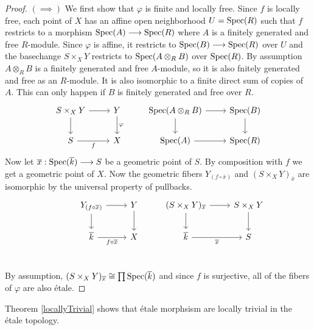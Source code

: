 \begin{proof}
  $(\implies)$
  We first show that $\varphi$ is finite and locally free. Since $f$ is locally free, each point of $X$ has an affine open neighborhood $U = \operatorname{Spec}(R)$ such that $f$ restricts to a morphism $\operatorname{Spec}(A) \longrightarrow \operatorname{Spec}(R)$ where $A$ is a finitely generated and free $R$-module. Since $\varphi$ is affine, it restricts to $\operatorname{Spec}(B) \longrightarrow \operatorname{Spec}(R)$ over $U$ and the basechange $S \times_X Y$ restricts to $\operatorname{Spec}(A \otimes_R B)$ over $\operatorname{Spec}(R)$. By assumption $A \otimes_R B$ is a finitely generated and free $A$-module, so it is also fnitely generated and free as an $R$-module. It is also isomorphic to a finite direct sum of copies of $A$. This can only happen if $B$ is finitely generated and free over $R$.
    \[
    \begin{tikzcd}
    	{S \times_X Y} & Y & {\Spec(A \otimes_RB)} & {\Spec(B)} \\
    	S & X & {\Spec(A)} & {\Spec(R)}
    	\arrow["\varphi", from=1-2, to=2-2]
    	\arrow["f"', from=2-1, to=2-2]
    	\arrow[from=1-1, to=1-2]
    	\arrow[from=1-1, to=2-1]
    	\arrow[from=1-3, to=2-3]
    	\arrow[from=2-3, to=2-4]
    	\arrow[from=1-3, to=1-4]
    	\arrow[from=1-4, to=2-4]
    \end{tikzcd}
    \]
  Now let $\overline{x} : \operatorname{Spec}(\overline{k}) \longrightarrow S$ be a geometric point of $S$. By composition with $f$ we get a geometric point of $X$. Now the geometric fibers $Y_{(f \circ \overline{x})}$ and $(S \times_X Y)_{\overline{x}}$  are isomorphic by the universal property of pullbacks. 
  \[
\begin{tikzcd}
	& {Y_{(f \circ \overline{x})}} & Y & {(S \times_X Y)_{\overline{x}}} & {S \times_X Y} \\
	& {\overline{k}} & X & {\overline{k}} & S \\
	{}
	\arrow[from=1-3, to=2-3]
	\arrow[from=1-2, to=1-3]
	\arrow["{f \circ \overline{x}}"', from=2-2, to=2-3]
	\arrow[from=1-2, to=2-2]
	\arrow[from=1-4, to=2-4]
	\arrow[from=1-4, to=1-5]
	\arrow[from=1-5, to=2-5]
	\arrow["{\overline{x}}"', from=2-4, to=2-5]
\end{tikzcd}
\]
By assumption, $(S\times_X Y)_{\overline{x}} \cong \prod \operatorname{Spec}(\overline{k})$ and since $f$ is surjective, all of the fibers of $\varphi$ are also \'etale.
\end{proof}
Theorem \ref{locallyTrivial} shows that \'etale morphsism are locally trivial in the \'etale topology.

